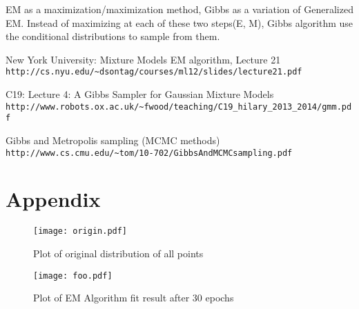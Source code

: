 \documentclass[11pt, oneside]{article}
\begin{document}
EM as a maximization/maximization method, Gibbs as a variation of Generalized EM. Instead of
maximizing at each of these two steps(E, M), Gibbs algorithm use the conditional distributions to sample from them.


\begin{thebibliography}{9}

New York University: Mixture Models EM algorithm, Lecture 21
\\\texttt{http://cs.nyu.edu/\~{}dsontag/courses/ml12/slides/lecture21.pdf}

C19: Lecture 4: A Gibbs Sampler for Gaussian Mixture Models\\
\texttt{http://www.robots.ox.ac.uk/\~{}fwood/teaching/C19\_hilary\_2013\_2014/gmm.pdf}

Gibbs and Metropolis sampling (MCMC methods)\\
\texttt{http://www.cs.cmu.edu/\~{}tom/10-702/GibbsAndMCMCsampling.pdf}

\end{thebibliography}

\section{Appendix}
\begin{figure}[h]
\centering
\texttt{[image: origin.pdf]}
\caption{Plot of original distribution of all points}
\centering
\texttt{[image: foo.pdf]}
\caption{Plot of EM Algorithm fit result after 30 epochs}
\end{figure}
\end{document}
